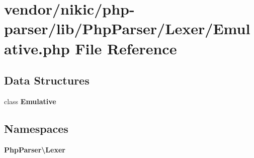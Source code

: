 \section{vendor/nikic/php-\/parser/lib/\+Php\+Parser/\+Lexer/\+Emulative.php File Reference}
\label{_emulative_8php}
\subsection*{Data Structures}
\begin{DoxyCompactItemize}
\item 
class {\bf Emulative}
\end{DoxyCompactItemize}
\subsection*{Namespaces}
\begin{DoxyCompactItemize}
\item 
 {\bf Php\+Parser\textbackslash{}\+Lexer}
\end{DoxyCompactItemize}
